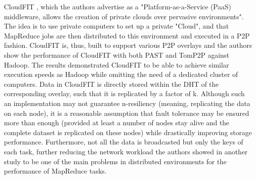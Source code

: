 CloudFIT \cite{Steffenel2015, Steffenel2015a}, which the authors advertise as a "Platform-as-a-Service (PaaS) middleware, allows the creation of private clouds over pervasive environments". The idea is to use private computers to set up a private "Cloud", and that MapReduce jobs are then distributed to this environment and executed in a P2P fashion. CloudFIT is, thus, built to support various P2P overlays and the authors show the performance of CloudFIT with both PAST and TomP2P against Hadoop. The results demonstrated CloudFIT to be able to achieve similar execution speeds as Hadoop while omitting the need of a dedicated cluster of computers. Data in CloudFIT is directly stored within the DHT of the corresponding overlay, such that it is replicated by a factor of k. Although such an implementation may not guarantee n-resiliency (meaning, replicating the data on each node), it is a reasonable assumption that fault tolerance may be ensured more than enough (provided at least a number of nodes stay alive and the complete dataset is replicated on these nodes) while drastically improving storage performance. Furthermore, not all the data is broadcasted but only the keys of each task, further reducing the network workload the authors showed in another study \cite{Steffenel2015a} to be one of the main problems in distributed environments for the performance of MapReduce tasks.

